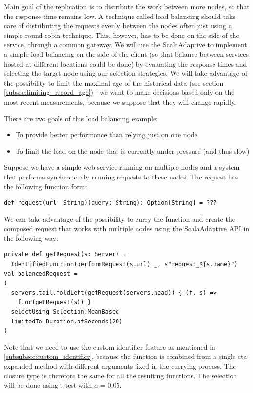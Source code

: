 Main goal of the replication is to distribute the work between more nodes, so that the response time remains low. A technique called load balancing should take care of distributing the requests evenly between the nodes often just using a simple round-robin technique. This, however, has to be done on the side of the service, through a common gateway. We will use the ScalaAdaptive to implement a simple load balancing on the side of the client (so that balance between services hosted at different locations could be done) by evaluating the response times and selecting the target node using our selection strategies. We will take advantage of the possibility to limit the maximal age of the historical data (see section \ref{subsec:limiting_record_age}) - we want to make decisions based only on the most recent measurements, because we suppose that they will change rapidly.

There are two goals of this load balancing example:

\begin{itemize}
	\item To provide better performance than relying just on one node
	\item To limit the load on the node that is currently under pressure (and thus slow)
\end{itemize}

Suppose we have a simple web service running on multiple nodes and a system that performs synchronously running requests to these nodes. The request has the following function form:

\lstset{style=Scala}
\begin{lstlisting}
def request(url: String)(query: String): Option[String] = ???
\end{lstlisting}

We can take advantage of the possibility to curry the function and create the composed request that works with multiple nodes using the ScalaAdaptive API in the following way:

\lstset{style=Scala}
\begin{lstlisting}
private def getRequest(s: Server) = 
  IdentifiedFunction(performRequest(s.url) _, s"request_${s.name}")
val balancedRequest =
(
  servers.tail.foldLeft(getRequest(servers.head)) { (f, s) =>
    f.or(getRequest(s)) }
  selectUsing Selection.MeanBased
  limitedTo Duration.ofSeconds(20)
)
\end{lstlisting}

Note that we need to use the custom identifier feature as mentioned in \ref{subsubsec:custom_identifier}, because the function is combined from a single eta-expanded method with different arguments fixed in the currying process. The closure type is therefore the same for all the resulting functions. The selection will be done using t-test with $\alpha = 0.05$.

